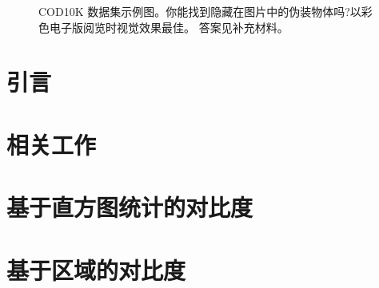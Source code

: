 \documentclass[final]{cvpr}
\begin{document}
\begin{figure}[tp]
{\begin{minipage}[htbp]{.2\textwidth}
    \end{minipage}
}
\caption{COD10K 数据集示例图。你能找到隐藏在图片中的伪装物体吗?以彩色电子版阅览时视觉效果最佳。 答案见补充材料。}
\label{fig:COD10K_examples}
\end{figure}





\begin{abstract}

\end{abstract}



\section{引言}\label{sec:Introduction}






\section{相关工作}
\label{sec:RelatedWorks}



\section{基于直方图统计的对比度}\label{sec:HC}

\section{基于区域的对比度}
\end{document}

